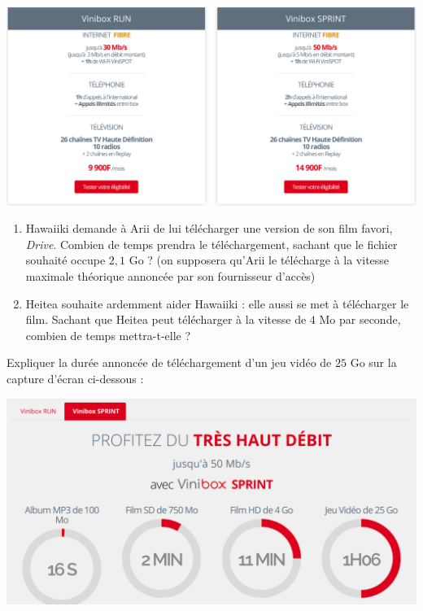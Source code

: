 \documentclass[a4paper]{article}
\begin{document}
\begin{center}
  \includegraphics[width=15cm]{evaluation_2_seconde_15_sujet_B_offres_vinibox_fibre.png}
\end{center}

\begin{enumerate}
  \item Hawaiiki demande à Arii de lui télécharger une version de son film favori, \textit{Drive}. Combien de temps prendra le téléchargement, sachant que le fichier souhaité occupe $2,1$ Go ? (on supposera qu'Arii le télécharge à la vitesse maximale théorique annoncée par son fournisseur d'accès)
  \item Heitea souhaite ardemment aider Hawaiiki : elle aussi se met à télécharger le film. Sachant que Heitea peut télécharger à la vitesse de $4$ Mo par seconde, combien de temps mettra-t-elle ?
\end{enumerate}

\bigskip

\exo[2 points] Expliquer la durée annoncée de téléchargement d'un jeu vidéo de $25$ Go sur la capture d'écran ci-dessous :

\begin{center}
  \includegraphics[width=15cm]{evaluation_2_seconde_15_sujet_B_vini.png}
\end{center}

\dotfill{}
\end{document}
